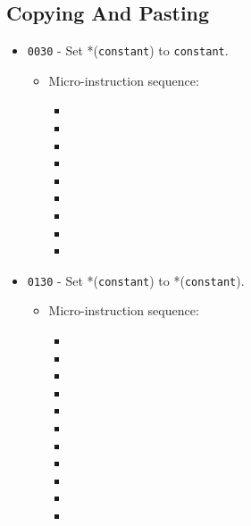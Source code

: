 \documentclass{article}
\begin{document}
\subsection{Copying And Pasting}
\begin{itemize}
    \item \Verb|0030| - Set *(\Verb|constant|) to \Verb|constant|.
    \begin{itemize}
        \item Micro-instruction sequence:
        \begin{itemize}
            \item \pkptroutinc
            \item \datatotmpa
            \item \incrementpk
            \item \pkptroutinc
            \item \holddata
            \item \tmpatoaddr
            \item \writeRAM
            \item \incrementpk
            \item \done
        \end{itemize}
    \end{itemize}
    
    \item \Verb|0130| - Set *(\Verb|constant|) to *(\Verb|constant|).
    \begin{itemize}
        \item Micro-instruction sequence:
        \begin{itemize}
            \item \pkptroutinc
            \item \datatotmpa
            \item \incrementpk
            \item \pkptroutinc
            \item \holddataaddr
            \item \readRAM
            \item \holddata
            \item \tmpatoaddr
            \item \writeRAM
            \item \incrementpk
            \item \done
        \end{itemize}
    \end{itemize}


\end{itemize}
\end{document}
